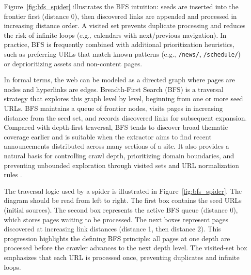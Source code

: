 Figure~\ref{fig:bfs_spider} illustrates the BFS intuition: seeds are inserted into the frontier first (distance 0), then discovered links are appended and processed in increasing distance order. A visited set prevents duplicate processing and reduces the risk of infinite loops (e.g., calendars with next/previous navigation). In practice, BFS is frequently combined with additional prioritization heuristics, such as preferring URLs that match known patterns (e.g., \texttt{/news/}, \texttt{/schedule/}) or deprioritizing assets and non-content pages.

In formal terms, the web can be modeled as a directed graph where pages are nodes and hyperlinks are edges. Breadth-First Search (BFS) is a traversal strategy that explores this graph level by level, beginning from one or more seed URLs. BFS maintains a queue of frontier nodes, visits pages in increasing distance from the seed set, and records discovered links for subsequent expansion. Compared with depth-first traversal, BFS tends to discover broad thematic coverage earlier and is suitable when the extractor aims to find recent announcements distributed across many sections of a site. It also provides a natural basis for controlling crawl depth, prioritizing domain boundaries, and preventing unbounded exploration through visited sets and URL normalization rules \cite{Sommerville2010}.

The traversal logic used by a spider is illustrated in Figure~\ref{fig:bfs_spider}. The diagram should be read from left to right. The first box contains the seed URLs (initial sources). The second box represents the active BFS queue (distance 0), which stores pages waiting to be processed. The next boxes represent pages discovered at increasing link distances (distance 1, then distance 2). This progression highlights the defining BFS principle: all pages at one depth are processed before the crawler advances to the next depth level. The visited-set box emphasizes that each URL is processed once, preventing duplicates and infinite loops.


